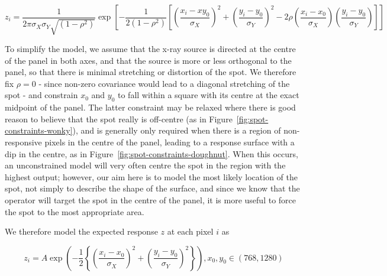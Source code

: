 \documentclass[\main/IO-Pixels.tex]{subfiles}
\begin{document}
\[ z_i = \frac{1}{2\pi \sigma_X \sigma_Y \sqrt{(1-\rho^2)}} \exp \left[ -\frac{1}{2(1-\rho^2)} \left[ \left(\frac{x_i-xy_0}{\sigma_X}\right)^2 + \left(\frac{y_i-y_0}{\sigma_Y}\right)^2 - 2\rho\left(\frac{x_i-x_0}{\sigma_X} \right) \left(\frac{y_i-y_0}{\sigma_Y} \right) \right] \right] \]

To simplify the model, we assume that the x-ray source is directed at the centre of the panel in both axes, and that the source is more or less orthogonal to the panel, so that there is minimal stretching or distortion of the spot. We therefore fix $\rho = 0$ - since non-zero covariance would lead to a diagonal stretching of the spot - and constrain $x_0$ and $y_0$ to fall within a square with its centre at the exact midpoint of the panel. The latter constraint may be relaxed where there is good reason to believe that the spot really is off-centre (as in Figure~\ref{fig:spot-constraints-wonky}), and is generally only required when there is a region of non-responsive pixels in the centre of the panel, leading to a response surface with a dip in the centre, as in Figure~\ref{fig:spot-constraints-doughnut}. When this occurs, an unconstrained model will very often centre the spot in the region with the highest output; however, our aim here is to model the most likely location of the spot, not simply to describe the shape of the surface, and since we know that the operator will target the spot in the centre of the panel, it is more useful to force the spot to the most appropriate area.


We therefore model the expected response $z$ at each pixel $i$ as

\[ z_i = A \exp \left(-\frac{1}{2} \left\lbrace \left(\frac{x_i - x_0}{\sigma_X}\right)^2 + \left(\frac{y_i - y_0}{\sigma_Y}\right)^2 \right\rbrace \right) , x_0, y_0 \in (768, 1280) \]
\end{document}
